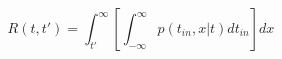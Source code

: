 \begin{equation}
R(t,t') = \int_{t'}^\infty \left[ \int_{-\infty}^\infty p(t_{in},x|t) dt_{in} \right]  dx 
\end{equation}
